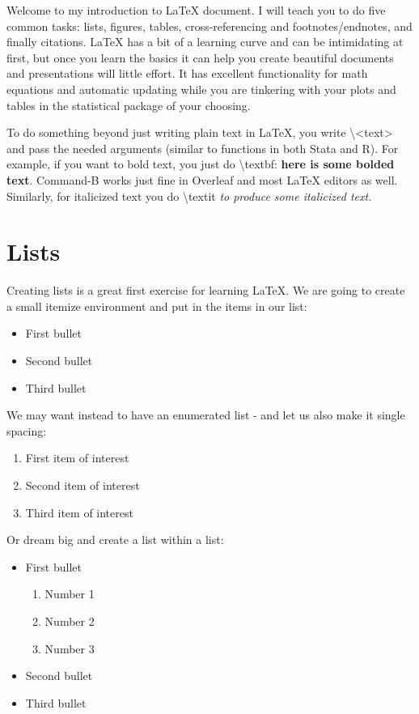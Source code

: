 \documentclass{article}
\begin{document}

Welcome to my introduction to LaTeX document. I will teach you to do five common tasks: lists, figures, tables, cross-referencing and footnotes/endnotes, and finally citations. LaTeX has a bit of a learning curve and can be intimidating at first, but once you learn the basics it can help you create beautiful documents and presentations will little effort. It has excellent functionality for math equations and automatic updating while you are tinkering with your plots and tables in the statistical package of your choosing. 

To do something beyond just writing plain text in LaTeX, you write \textbackslash <text> and pass the needed arguments (similar to functions in both Stata and R). For example, if you want to bold text, you just do \textbackslash textbf: \textbf{here is some bolded text}. Command-B works just fine in Overleaf and most LaTeX editors as well. Similarly, for italicized text you do \textbackslash textit \textit{to produce some italicized text.}

\section{Lists} 

Creating lists is a great first exercise for learning LaTeX. We are going to create a small itemize environment and put in the items in our list:

\begin{itemize} 
  \item First bullet
  \item Second bullet
  \item Third bullet
\end{itemize}

\noindent We may want instead to have an enumerated list - and let us also make it single spacing:
\begin{enumerate} %
	\singlespacing %
  \item First item of interest
  \item Second item of interest
  \item Third item of interest
\end{enumerate}

\noindent Or dream big and create a list within a list:
\begin{itemize} %
	\singlespacing
  \item First bullet
    \begin{enumerate} %
    \item Number 1
    \item Number 2
    \item Number 3
 	\end{enumerate}
  \item Second bullet
  \item Third bullet
\end{itemize}
\end{document}
